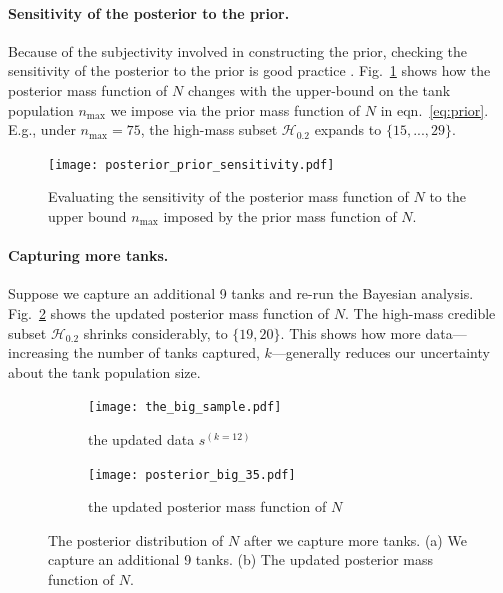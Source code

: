 \documentclass[11pt, oneside]{article}
\begin{document}
\paragraph{Sensitivity of the posterior to the prior.} Because of the subjectivity involved in constructing the prior, checking the sensitivity of the posterior to the prior is good practice \cite{van2021bayesian}. Fig.~\ref{fig:posterior_sensitivity} shows how the posterior mass function of $N$ changes with the upper-bound on the tank population $n_\text{max}$ we impose via the prior mass function of $N$ in eqn.~\ref{eq:prior}. 
E.g., under $n_\text{max} =75$, the high-mass subset $\mathcal{H}_{0.2}$ expands to $\{15, ..., 29\}$.

  \begin{figure}[h!]
        	\centering
	
		\texttt{[image: posterior\_prior\_sensitivity.pdf]}
            \caption{Evaluating the sensitivity of the posterior mass function of $N$ to the upper bound $n_{\text{max}}$ imposed by the prior mass function of $N$.} \label{fig:posterior_sensitivity}
\end{figure}

\paragraph{Capturing more tanks.} Suppose we capture an additional 9 tanks and re-run the Bayesian analysis. Fig.~\ref{fig:moretanks} shows the updated posterior mass function of $N$. The high-mass credible subset $\mathcal{H}_{0.2}$ shrinks considerably, to $\{19, 20\}$. This shows how more data---increasing the number of tanks captured, $k$---generally reduces our uncertainty about the tank population size.

  \begin{figure}[h!]
        	\centering
	\begin{subfigure}[b]{0.5\textwidth}
        		\texttt{[image: the\_big\_sample.pdf]}
		\caption{the updated data $s^{(k=12)}$}
	\end{subfigure}
	\begin{subfigure}[b]{0.5\textwidth}
	 \texttt{[image: posterior\_big\_35.pdf]}
	 \caption{the updated posterior mass function of $N$}
	     	\end{subfigure}
            \caption{The posterior distribution of $N$ after we capture more tanks. (a) We capture an additional 9 tanks. (b) The updated posterior mass function of $N$.
            	} \label{fig:moretanks}
\end{figure}
\end{document}
